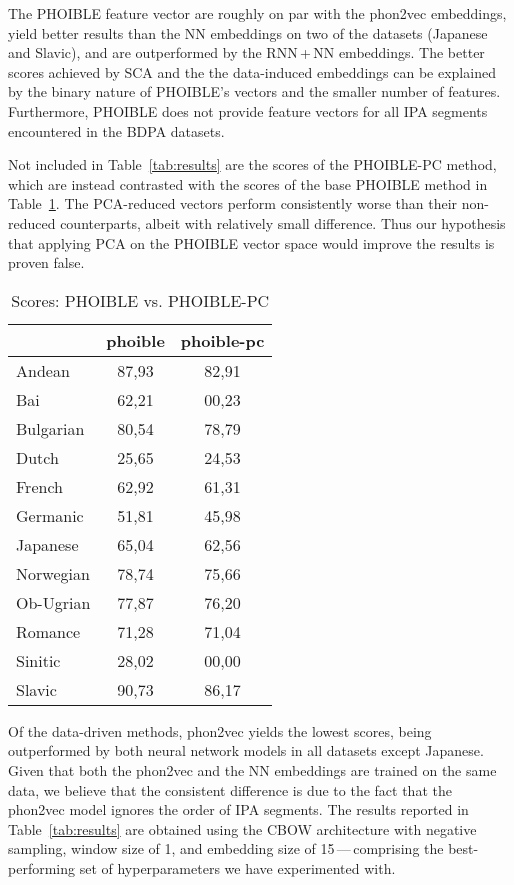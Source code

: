 \documentclass[a4paper]{report}
\begin{document}
The PHOIBLE feature vector are roughly on par with the phon2vec embeddings,
yield better results than the NN embeddings on two of the datasets (Japanese and Slavic), and are outperformed by the RNN\,+\,NN embeddings.
The better scores achieved by SCA and the the data-induced embeddings can be explained by the binary nature of PHOIBLE's vectors and the smaller number of features.
Furthermore, PHOIBLE does not provide feature vectors for all IPA segments encountered in the BDPA datasets.

Not included in Table~\ref{tab:results} are the scores of the PHOIBLE-PC method,
which are instead contrasted with the scores of the base PHOIBLE method in Table~\ref{tab:results-phoible}.
The PCA-reduced vectors perform consistently worse than their non-reduced counterparts, albeit with relatively small difference.
Thus our hypothesis that applying PCA on the PHOIBLE vector space would improve the results is proven false.

\begin{table}[h]
	\centering\small
	\begin{tabular}{l *{2}{c}}
		\toprule
		& phoible & phoible-pc \\
		\midrule
		Andean		&	87,93 &	82,91 \\
		Bai			&	62,21 &	00,23 \\
		Bulgarian	&	80,54 &	78,79 \\
		Dutch		&	25,65 &	24,53 \\
		French		&	62,92 &	61,31 \\
		Germanic	&	51,81 &	45,98 \\
		Japanese	&	65,04 &	62,56 \\
		Norwegian	&	78,74 &	75,66 \\
		Ob-Ugrian	&	77,87 &	76,20 \\
		Romance		&	71,28 &	71,04 \\
		Sinitic		&	28,02 &	00,00 \\
		Slavic		&	90,73 &	86,17 \\
		\bottomrule
	\end{tabular}
	\caption{Scores: PHOIBLE vs. PHOIBLE-PC}
	\label{tab:results-phoible}
\end{table}

Of the data-driven methods, phon2vec yields the lowest scores, being outperformed by both neural network models in all datasets except Japanese.
Given that both the phon2vec and the NN embeddings are trained on the same data,
we believe that the consistent difference is due to the fact that the phon2vec model ignores the order of IPA segments.
The results reported in Table~\ref{tab:results} are obtained using
the CBOW architecture with negative sampling, window size of 1, and embedding size of 15\,---\,comprising
the best-performing set of hyperparameters we have experimented with.
\end{document}
